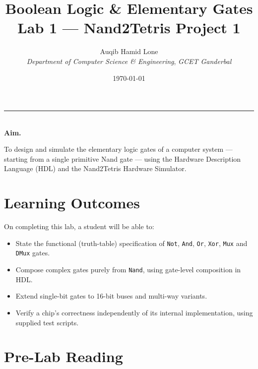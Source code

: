\documentclass[11pt]{article}
\title{Boolean Logic \& Elementary Gates\\\large Lab 1 --- Nand2Tetris Project 1}
\author{Auqib Hamid Lone\\[0.3em]
  \emph{Department of Computer Science \& Engineering}, \emph{GCET Ganderbal}}
\date{\today}
\newenvironment{aimbox}{%
  \par\noindent\begin{minipage}{\linewidth}\vspace{0.4em}
  \textcolor{primary-blue}{\rule{\linewidth}{0.8pt}}\\[0.3em]
  \textbf{\textcolor{primary-blue}{Aim.}}\ \itshape
}{%
  \end{minipage}\vspace{0.4em}\par
}
\begin{document}
\maketitle

\begin{aimbox}
To design and simulate the elementary logic gates of a computer system --- starting from a single primitive Nand gate --- using the Hardware Description Language (HDL) and the Nand2Tetris Hardware Simulator.
\end{aimbox}

\section{Learning Outcomes}

On completing this lab, a student will be able to:
\begin{itemize}
  \item State the functional (truth-table) specification of \texttt{Not}, \texttt{And}, \texttt{Or}, \texttt{Xor}, \texttt{Mux} and \texttt{DMux} gates.
  \item Compose complex gates purely from \texttt{Nand}, using gate-level composition in HDL.
  \item Extend single-bit gates to 16-bit buses and multi-way variants.
  \item Verify a chip's correctness independently of its internal implementation, using supplied test scripts.
\end{itemize}

\section{Pre-Lab Reading}
\end{document}
